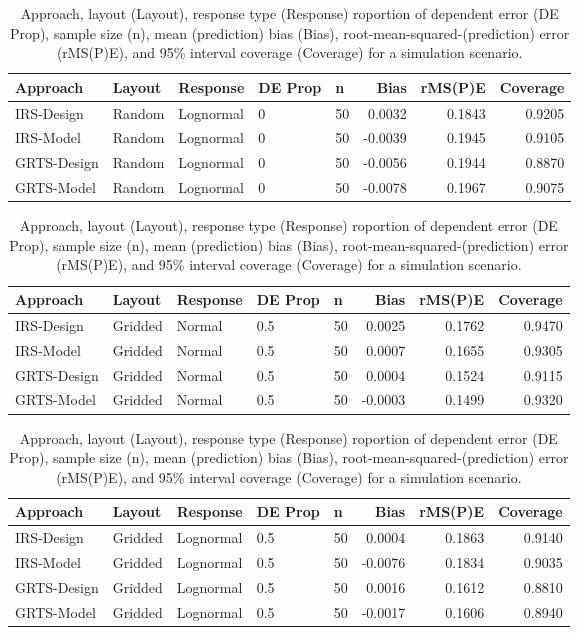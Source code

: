 \documentclass[]{elsarticle} %
\begin{document}
\begin{table}[ht]
\centering
\begin{tabular}{lllllrrr}
  \hline
Approach & Layout & Response & DE Prop & n & Bias & rMS(P)E & Coverage \\ 
  \hline
IRS-Design & Random & Lognormal & 0 & 50 & 0.0032 & 0.1843 & 0.9205 \\ 
  IRS-Model & Random & Lognormal & 0 & 50 & -0.0039 & 0.1945 & 0.9105 \\ 
  GRTS-Design & Random & Lognormal & 0 & 50 & -0.0056 & 0.1944 & 0.8870 \\ 
  GRTS-Model & Random & Lognormal & 0 & 50 & -0.0078 & 0.1967 & 0.9075 \\ 
   \hline
\end{tabular}
\caption{Approach, layout (Layout), response type (Response) roportion of dependent error (DE Prop), sample size (n), mean (prediction) bias (Bias), root-mean-squared-(prediction) error (rMS(P)E), and 95\% interval coverage (Coverage) for a simulation scenario.} 
\end{table}
\begin{table}[ht]
\centering
\begin{tabular}{lllllrrr}
  \hline
Approach & Layout & Response & DE Prop & n & Bias & rMS(P)E & Coverage \\ 
  \hline
IRS-Design & Gridded & Normal & 0.5 & 50 & 0.0025 & 0.1762 & 0.9470 \\ 
  IRS-Model & Gridded & Normal & 0.5 & 50 & 0.0007 & 0.1655 & 0.9305 \\ 
  GRTS-Design & Gridded & Normal & 0.5 & 50 & 0.0004 & 0.1524 & 0.9115 \\ 
  GRTS-Model & Gridded & Normal & 0.5 & 50 & -0.0003 & 0.1499 & 0.9320 \\ 
   \hline
\end{tabular}
\caption{Approach, layout (Layout), response type (Response) roportion of dependent error (DE Prop), sample size (n), mean (prediction) bias (Bias), root-mean-squared-(prediction) error (rMS(P)E), and 95\% interval coverage (Coverage) for a simulation scenario.} 
\end{table}
\begin{table}[ht]
\centering
\begin{tabular}{lllllrrr}
  \hline
Approach & Layout & Response & DE Prop & n & Bias & rMS(P)E & Coverage \\ 
  \hline
IRS-Design & Gridded & Lognormal & 0.5 & 50 & 0.0004 & 0.1863 & 0.9140 \\ 
  IRS-Model & Gridded & Lognormal & 0.5 & 50 & -0.0076 & 0.1834 & 0.9035 \\ 
  GRTS-Design & Gridded & Lognormal & 0.5 & 50 & 0.0016 & 0.1612 & 0.8810 \\ 
  GRTS-Model & Gridded & Lognormal & 0.5 & 50 & -0.0017 & 0.1606 & 0.8940 \\ 
   \hline
\end{tabular}
\caption{Approach, layout (Layout), response type (Response) roportion of dependent error (DE Prop), sample size (n), mean (prediction) bias (Bias), root-mean-squared-(prediction) error (rMS(P)E), and 95\% interval coverage (Coverage) for a simulation scenario.} 
\end{table}
\end{document}
